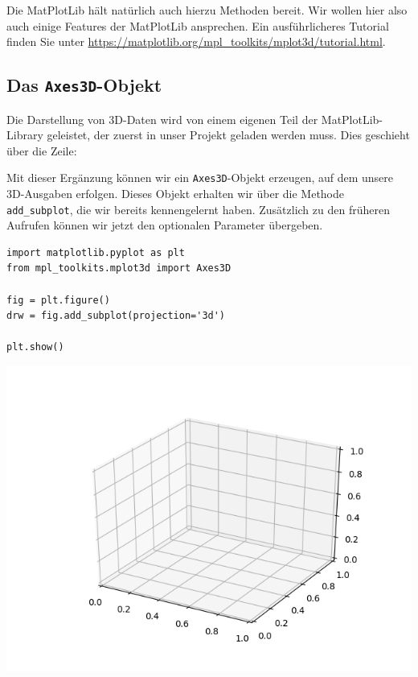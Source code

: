 Die MatPlotLib hält natürlich auch hierzu Methoden bereit. Wir wollen hier also auch einige Features der MatPlotLib ansprechen. Ein ausführlicheres Tutorial finden Sie unter \url{https://matplotlib.org/mpl_toolkits/mplot3d/tutorial.html}.

\subsection{Das \texttt{Axes3D}-Objekt}
\begin{minipage}{\linewidth}
Die Darstellung von 3D-Daten wird von einem eigenen Teil der MatPlotLib-Library geleistet, der zuerst in unser Projekt geladen werden muss. Dies geschieht über die Zeile:
\vspace{-6pt}
\begin{center}
\end{center}
\end{minipage}

Mit dieser Ergänzung können wir ein \texttt{Axes3D}-Objekt erzeugen, auf dem unsere 3D-Ausgaben erfolgen. Dieses Objekt erhalten wir über die Methode \texttt{add\_subplot}, die wir bereits kennengelernt haben. Zusätzlich zu den früheren Aufrufen können wir jetzt den optionalen Parameter  übergeben.

\begin{codebox}[Beispiel: Leerer 3D-Plot, width=.55\linewidth, nobeforeafter, equal height group = grpXmpEmpty3D]
\begin{verbatim}
import matplotlib.pyplot as plt
from mpl_toolkits.mplot3d import Axes3D

fig = plt.figure()
drw = fig.add_subplot(projection='3d')

plt.show()
\end{verbatim}
\end{codebox}
%
\begin{tcolorbox}[title=Ausgabe: Leerer 3D-Plot, width=.45\linewidth, nobeforeafter, equal height group = grpXmpEmpty3D]
	\includegraphics[width=\linewidth]{./gfx/plt-axes3D}
\end{tcolorbox}

